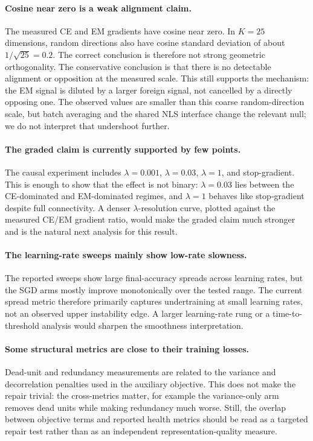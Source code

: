 \paragraph{Cosine near zero is a weak alignment claim.}
The measured CE and EM gradients have cosine near zero. In $K=25$ dimensions,
random directions also have cosine standard deviation of about
$1/\sqrt{25}=0.2$. The correct conclusion is therefore not strong geometric
orthogonality. The conservative conclusion is that there is no detectable
alignment or opposition at the measured scale. This still supports the
mechanism: the EM signal is diluted by a larger foreign signal, not cancelled
by a directly opposing one. The observed values are smaller than this coarse
random-direction scale, but batch averaging and the shared NLS interface
change the relevant null; we do not interpret that undershoot further.

\paragraph{The graded claim is currently supported by few points.}
The causal experiment includes $\lambda=0.001$, $\lambda=0.03$, $\lambda=1$,
and stop-gradient. This is enough to show that the effect is not binary:
$\lambda=0.03$ lies between the CE-dominated and EM-dominated regimes, and
$\lambda=1$ behaves like stop-gradient despite full connectivity. A denser
$\lambda$-resolution curve, plotted against the measured CE/EM gradient ratio,
would make the graded claim much stronger and is the natural next analysis for
this result.

\paragraph{The learning-rate sweeps mainly show low-rate slowness.}
The reported sweeps show large final-accuracy spreads across learning rates,
but the SGD arms mostly improve monotonically over the tested range. The
current spread metric therefore primarily captures undertraining at small
learning rates, not an observed upper instability edge. A larger
learning-rate rung or a time-to-threshold analysis would sharpen the
smoothness interpretation.

\paragraph{Some structural metrics are close to their training losses.}
Dead-unit and redundancy measurements are related to the variance and
decorrelation penalties used in the auxiliary objective. This does not make
the repair trivial: the cross-metrics matter, for example the variance-only
arm removes dead units while making redundancy much worse. Still, the overlap
between objective terms and reported health metrics should be read as a
targeted repair test rather than as an independent representation-quality
measure.

